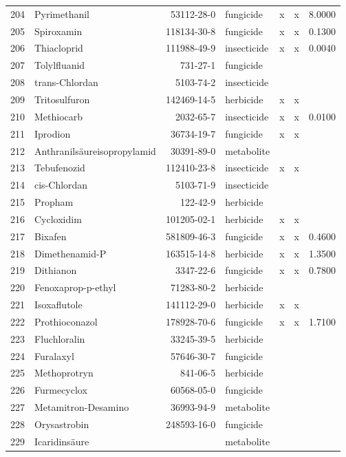 \begin{longtable}{lp{3cm}rlp{0.5cm}p{0.5cm}p{1.5cm}}
  204 & Pyrimethanil & 53112-28-0 & fungicide & x & x & 8.0000 \\ 
  205 & Spiroxamin & 118134-30-8 & fungicide & x & x & 0.1300 \\ 
  206 & Thiacloprid & 111988-49-9 & insecticide & x & x & 0.0040 \\ 
  207 & Tolylfluanid & 731-27-1 & fungicide &  &  &  \\ 
  208 & trans-Chlordan & 5103-74-2 & insecticide &  &  &  \\ 
  209 & Tritosulfuron & 142469-14-5 & herbicide & x & x &  \\ 
  210 & Methiocarb & 2032-65-7 & insecticide & x & x & 0.0100 \\ 
  211 & Iprodion & 36734-19-7 & fungicide & x & x &  \\ 
  212 & Anthranilsäureisopropylamid & 30391-89-0 & metabolite &  &  &  \\ 
  213 & Tebufenozid & 112410-23-8 & insecticide & x & x &  \\ 
  214 & cis-Chlordan & 5103-71-9 & insecticide &  &  &  \\ 
  215 & Propham & 122-42-9 & herbicide &  &  &  \\ 
  216 & Cycloxidim & 101205-02-1 & herbicide & x & x &  \\ 
  217 & Bixafen & 581809-46-3 & fungicide & x & x & 0.4600 \\ 
  218 & Dimethenamid-P & 163515-14-8 & herbicide & x & x & 1.3500 \\ 
  219 & Dithianon & 3347-22-6 & fungicide & x & x & 0.7800 \\ 
  220 & Fenoxaprop-p-ethyl & 71283-80-2 & herbicide &  &  &  \\ 
  221 & Isoxaflutole & 141112-29-0 & herbicide & x & x &  \\ 
  222 & Prothioconazol & 178928-70-6 & fungicide & x & x & 1.7100 \\ 
  223 & Fluchloralin & 33245-39-5 & herbicide &  &  &  \\ 
  224 & Furalaxyl & 57646-30-7 & fungicide &  &  &  \\ 
  225 & Methoprotryn & 841-06-5 & herbicide &  &  &  \\ 
  226 & Furmecyclox & 60568-05-0 & fungicide &  &  &  \\ 
  227 & Metamitron-Desamino & 36993-94-9 & metabolite &  &  &  \\ 
  228 & Orysastrobin & 248593-16-0 & fungicide &  &  &  \\ 
  229 & Icaridinsäure &  & metabolite &  &  &  \\ 

\end{longtable}
